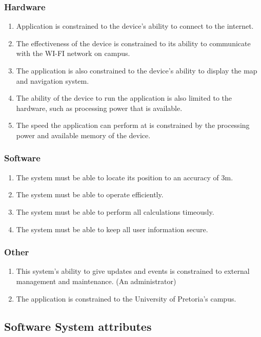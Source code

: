 \documentclass[english]{article}
\begin{document}
				 \subsubsection{Hardware}
					\begin{enumerate}
						 \item Application is constrained to the device’s ability to connect to the internet. 
						 \item The effectiveness of the device is constrained to its ability to communicate with the WI-FI network on campus.	
						 \item The application is also constrained to the device’s ability to display the map and navigation system. 
						 \item The ability of the device to run the application is also limited to the hardware, such as processing power that is available. 
						 \item The speed the application can perform at is constrained by the processing power and available memory of the device.
					\end{enumerate}
				 \subsubsection{Software}
					\begin{enumerate}
					\item The system must be able to locate its position to an accuracy of 3m.
					\item The system must be able to operate efficiently.
					\item The system must be able to perform all calculations timeously.
					\item The system must be able to keep all user information secure.
					\end{enumerate}
					 \subsubsection{Other}
					\begin{enumerate}
					\item
					This system’s ability to give updates and events is constrained to external management and maintenance. (An administrator)   
					\item
					The application is constrained to the University of Pretoria’s campus.
					\end{enumerate}
					
									\newpage
				\subsection{Software System attributes}
				
\end{document}
